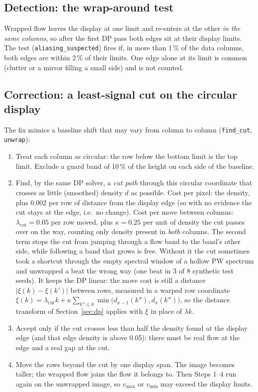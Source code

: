 \documentclass[11pt,a4paper]{article}
\newcommand{\code}[1]{\texttt{\small #1}}
\newcommand{\vmax}{v_{\max}}
\newcommand{\vmin}{v_{\min}}
\begin{document}
\subsection{Detection: the wrap-around test}
Wrapped flow leaves the display at one limit and re-enters at the other \emph{in the same columns}, so after the first
DP pass both edges sit at their display limits. The test (\code{aliasing\_suspected}) fires if, in more than 1\,\% of the
data columns, both edges are within 2\,\% of their limits. One edge alone at its limit is common (clutter or a mirror
filling a small side) and is not counted.

\subsection{Correction: a least-signal cut on the circular display}
The fix mimics a baseline shift that may vary from column to column (\code{find\_cut}, \code{unwrap}):
\begin{enumerate}
\item Treat each column as circular: the row below the bottom limit is the top limit. Exclude a guard band of 10\,\%
of the height on each side of the baseline.
\item Find, by the same DP solver, a \emph{cut path} through this circular coordinate that crosses as little
(smoothed) density $d$ as possible. Cost per pixel: the density, plus 0.002 per row of distance from the display edge
(so with no evidence the cut stays at the edge, i.e.\ no change). Cost per move between columns: $\lambda_{\mathrm{cut}}
= 0.05$ per row moved, plus $\kappa = 0.25$ per unit of density the cut passes over on the way, counting only density
present in \emph{both} columns. The second term stops the cut from jumping through a flow band to the band's other
side, while following a band that grows is free. Without it the cut sometimes took a shortcut through the empty
spectral window of a hollow PW spectrum and unwrapped a beat the wrong way (one beat in 3 of 8 synthetic test
seeds). It keeps the DP linear: the move cost is still a distance $|\xi(k) - \xi(k')|$ between rows, measured in a
warped row coordinate $\xi(k) = \lambda_{\mathrm{cut}} k + \kappa \sum_{k'' \le k} \min\big(d_{x-1}(k''), d_x(k'')\big)$,
so the distance transform of Section~\ref{sec:dp} applies with $\xi$ in place of $\lambda k$.
\item Accept only if the cut crosses less than half the density found at the display edge (and that edge density is
above 0.05): there must be real flow at the edge and a real gap at the cut.
\item Move the rows beyond the cut by one display span. The image becomes taller; the wrapped flow joins the flow it
belongs to. Then Steps 1--4 run again on the unwrapped image, so $\vmax$ or $\vmin$ may exceed the display limits.
\end{enumerate}
\end{document}
